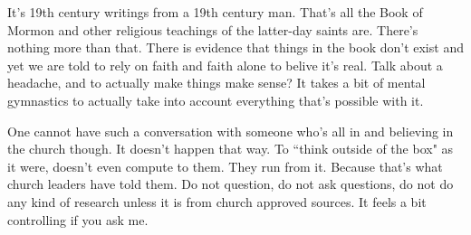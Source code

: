It's 19th century writings from a 19th century man. That's all the Book of Mormon and
other religious teachings of the latter-day saints are. There's nothing more than
that. There is evidence that things in the book don't exist and yet we are told to
rely on faith and faith alone to belive it's real. Talk about a headache, and to
actually make things make sense? It takes a bit of mental gymnastics to actually take
into account everything that's possible with it.

One cannot have such a conversation with someone who's all in and believing in the
church though. It doesn't happen that way. To ``think outside of the box" as it were,
doesn't even compute to them. They run from it. Because that's what church leaders
have told them. Do not question, do not ask questions, do not do any kind of research
unless it is from church approved sources. It feels a bit controlling if you ask me.